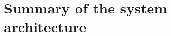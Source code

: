 \begin{itemize}





    \end{itemize}

    \section{Summary of the system architecture}\label{sec:systemconclusion}

